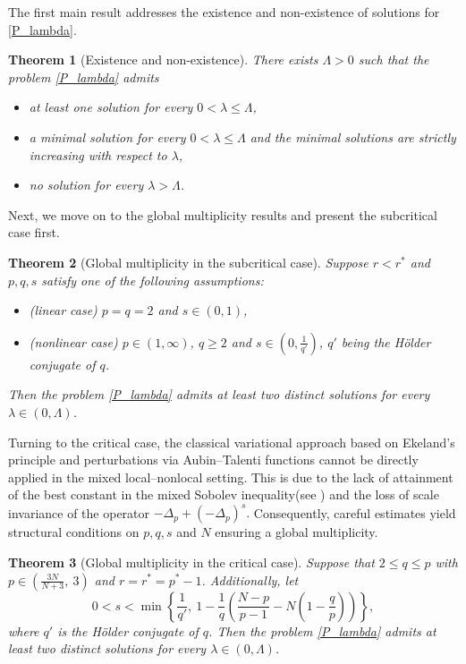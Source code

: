 \documentclass[reqno,oneside]{amsart}
\newtheorem{theorem}{Theorem}[section]
\theoremstyle{definition}
\theoremstyle{remark}
\numberwithin{equation}{section}
\newcommand{\p}{\Delta_p}
\newcommand{\ps}{(-\Delta_p)^s}
\newcommand{\la} {\lambda}
\begin{document}
The first main result addresses the existence and non-existence of solutions for \eqref{P_lambda}.

\begin{theorem}[Existence and non-existence]\label{Theorem_first_solution}
    There exists $\Lambda > 0$ such that the problem \eqref{P_lambda} admits
    \begin{itemize}
        \item[(a)] at least one solution for every $0 < \la \leq \Lambda$,
        \item[(b)] a minimal solution for every $0 < \la \leq \Lambda$ and the minimal solutions are strictly increasing with respect to $\la$,
        \item[(c)] no solution for every $\la > \Lambda$.
    \end{itemize}
\end{theorem}

Next, we move on to the global multiplicity results and present the subcritical case first.

\begin{theorem}[Global multiplicity in the subcritical case]\label{Theorem_second_solution_subcritical}
    Suppose $r< r^*$ and $p,q,s$ satisfy one of the following assumptions:
    \begin{itemize}
        \item[(i)] (linear case) $p=q=2$ and $s\in (0,1)$,
        \item[(ii)] (nonlinear case) $p\in (1,\infty)$, $q \geq 2$ and $s\in \left(0, \frac{1}{q'} \right)$, $q'$ being the H\"older conjugate of $q$.
    \end{itemize}
    Then the problem \eqref{P_lambda} admits at least two distinct solutions for every $\la\in (0, \Lambda)$.
\end{theorem}

Turning to the critical case, the classical variational approach based on Ekeland’s principle and perturbations via Aubin–Talenti functions cannot be directly applied in the mixed local–nonlocal setting. This is due to the lack of attainment of the best constant in the mixed Sobolev inequality(see \cite{biagi2025brezisnirenberg}) and the loss of scale invariance of the operator $-\p + \ps.$ Consequently, careful estimates yield structural conditions on 
$p,q,s$ and $N$ ensuring a global multiplicity.

\begin{theorem}[Global multiplicity in the critical case]\label{Theorem_second_solution_critical}
    Suppose that $2\leq q\leq p$ with $p \in \left( \frac{3N}{N+3},\ 3 \right)$ and $r= r^* = p^* -1$. Additionally, let
    \[0<s< \min \left\{ \frac{1}{q'},\ 1- \frac{1}{q} \left(\frac{N-p}{p-1} - N \left( 1- \frac{q}{p} \right) \right) \right\},\]
    where $q'$ is the H\"older conjugate of $q$. Then the problem \eqref{P_lambda} admits at least two distinct solutions for every $\la\in (0, \Lambda)$.
\end{theorem}
\end{document}
